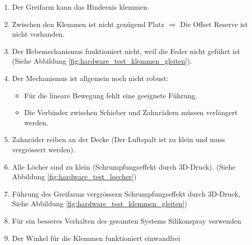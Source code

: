 \documentclass[../main.tex]{subfiles}
\begin{document}
\begin{enumerate}
    \item Der Greifarm kann das Hindernis klemmen.
    \item Zwischen den Klemmen ist nicht genügend Platz $\Rightarrow$ Die Offset Reserve ist nicht vorhanden.
    \item Der Hebemechanismus funktioniert nicht, weil die Feder nicht geführt ist (Siehe Abbildung \ref{fig:hardware_test_klemmen_gleiten}).
    \item Der Mechanismus ist allgemein noch nicht robust:
    \begin{itemize}
        \item Für die lineare Bewegung fehlt eine geeignete Führung.
        \item Die Verbinder zwischen Schieber und Zahnrädern müssen verlängert werden.
    \end{itemize}
    \item Zahnräder reiben an der Decke (Der Luftspalt ist zu klein und muss vergrössert werden).
    \item Alle Löcher sind zu klein (Schrumpfungseffekt durch 3D-Druck). (Siehe Abbildung \ref{fig:hardware_test_loecher})
    \item Führung des Greifarms vergrössern Schrumpfungseffekt durch 3D-Druck, Siehe Abbildung \ref{fig:hardware_test_klemmen_gleiten})
    \item Für ein besseres Verhalten des gesamten Systems Silikonspray verwenden
    \item Der Winkel für die Klemmen funktioniert einwandfrei
\end{enumerate}
\end{document}
